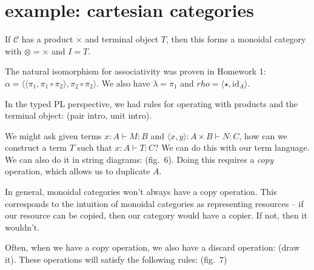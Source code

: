 \hypertarget{example-cartesian-categories}{%
\section{example: cartesian
categories}\label{example-cartesian-categories}}

If \(\mathcal{C}\) has a product \(\times\) and terminal object \(T\),
then this forms a monoidal category with \(\otimes = \times\) and
\(I = T\).

The natural isomorphism for associativity was proven in Homework 1:
\(\alpha = \langle \langle \pi_1, \pi_1 \circ \pi_2 \rangle, \pi_2 \circ \pi_2 \rangle\).
We also have \(\lambda = \pi_1\) and
\(rho = \langle \star, \text{id}_A \rangle\).

In the typed PL perspective, we had rules for operating with products
and the terminal object: (pair intro, unit intro).

We might ask given terms \(x : A \vdash M : B\) and
\(\langle x, y \rangle : A \times B \vdash N : C\), how can we construct
a term \(T\) such that \(x : A \vdash T : C\)? We can do this with our
term language. We can also do it in string diagrams: (fig.~6). Doing
this requires a \emph{copy} operation, which allows us to duplicate
\(A\).

In general, monoidal categories won't always have a copy operation. This
corresponds to the intuition of monoidal categories as representing
resources -- if our resource can be copied, then our category would have
a copier. If not, then it wouldn't.

Often, when we have a copy operation, we also have a discard operation:
(draw it). These operations will satisfy the following rules: (fig.~7)
